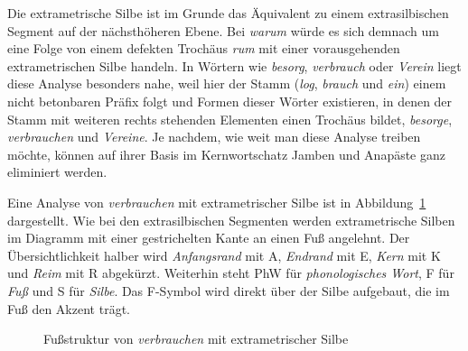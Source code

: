 Die extrametrische Silbe ist im Grunde das Äquivalent zu einem extrasilbischen Segment auf der nächsthöheren Ebene. 
Bei \textit{wa\Akz rum} würde es sich demnach um eine Folge von einem defekten Trochäus \textit{\Akz rum} mit einer vorausgehenden extrametrischen Silbe handeln.
In Wörtern wie \textit{be\Akz sorg}, \textit{ver\Akz brauch} oder \textit{Ver\Akz ein} liegt diese Analyse besonders nahe, weil hier der Stamm (\textit{log}, \textit{brauch} und \textit{ein}) einem nicht betonbaren Präfix folgt und \idR Formen dieser Wörter existieren, in denen der Stamm mit weiteren rechts stehenden Elementen einen Trochäus bildet, \zB \textit{be\Akz sorge}, \textit{ver\Akz brauchen} und \textit{Ver\Akz eine}.
Je nachdem, wie weit man diese Analyse treiben möchte, können auf ihrer Basis im Kernwortschatz Jamben und Anapäste ganz eliminiert werden.

Eine Analyse von \textit{verbrauchen} mit extrametrischer Silbe ist in Abbildung~\ref{fig:verbrauchen} dargestellt.
Wie bei den extrasilbischen Segmenten werden extrametrische Silben im Diagramm mit einer gestrichelten Kante an einen Fuß angelehnt.
Der Übersichtlichkeit halber wird \textit{Anfangsrand} mit A, \textit{Endrand} mit E, \textit{Kern} mit K und \textit{Reim} mit R abgekürzt.
Weiterhin steht PhW für \textit{phonologisches Wort}, F für \textit{Fuß} und S für \textit{Silbe}.
Das F-Symbol wird direkt über der Silbe aufgebaut, die im Fuß den Akzent trägt.

\begin{figure}[!htbp]
	\centering
	\label{fig:verbrauchen}
	\caption{Fußstruktur von \textit{verbrauchen} mit extrametrischer Silbe}
\end{figure}

